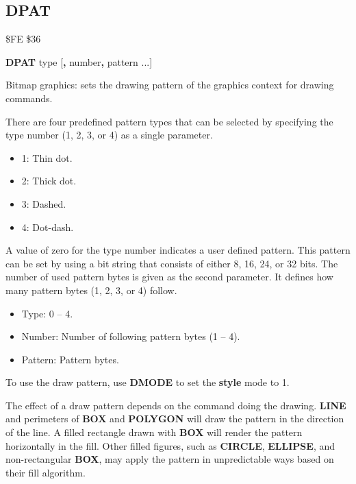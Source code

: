 \subsection{DPAT}
\begin{description}[leftmargin=2cm,style=nextline]
\item [Token:]    \$FE \$36

\item [Format:]   {\bf DPAT} type [{\bf,} number{\bf,} pattern ...]

\item [Usage:]    Bitmap graphics: sets the drawing pattern of the graphics context for drawing commands.

                  There are four predefined pattern types that can be selected by specifying the type number (1, 2, 3, or 4) as a single parameter.

                  \begin{itemize}
                     \item 1: Thin dot.
                     \item 2: Thick dot.
                     \item 3: Dashed.
                     \item 4: Dot-dash.
                  \end{itemize}

                  A value of zero for the type number indicates a user defined pattern. This pattern can be set by using a bit string that consists of either 8, 16, 24, or 32 bits. The number of used pattern bytes is given as the second parameter. It defines how many pattern bytes (1, 2, 3, or 4) follow.

                  \begin{itemize}
                     \item Type: 0 -- 4.
                     \item Number: Number of following pattern bytes (1 -- 4).
                     \item Pattern: Pattern bytes.
                  \end{itemize}

\item[Remarks:]   To use the draw pattern, use {\bf DMODE} to set the {\bf style} mode to 1.

                  The effect of a draw pattern depends on the command doing the drawing. {\bf LINE} and perimeters of {\bf BOX} and {\bf POLYGON} will draw the pattern in the direction of the line. A filled rectangle drawn with {\bf BOX} will render the pattern horizontally in the fill. Other filled figures, such as {\bf CIRCLE}, {\bf ELLIPSE}, and non-rectangular {\bf BOX}, may apply the pattern in unpredictable ways based on their fill algorithm.


\end{description}

